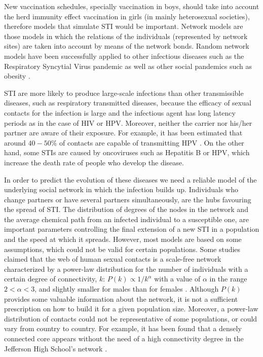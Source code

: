 New vaccination schedules, specially vaccination in boys, should take into account the herd immunity effect vaccination in girls (in mainly heterosexual societies), therefore models that simulate STI would be important. Network models are those models in which the relations of the individuals (represented by network sites) are taken into account by means of the network bonds. Random network models have been successfully applied to other infectious diseases such as the Respiratory Syncytial Virus pandemic \cite{acedo2011using} as well as other social pandemics such as obesity \cite{christakis2007spread}.

STI are more likely to produce large-scale infections than other transmissible diseases, such as respiratory transmitted diseases, because the efficacy of sexual contacts for the infection is large and the infectious agent has long latency periods as in the case of HIV or HPV. Moreover, neither the carrier nor his/her partner are aware of their exposure. For example, it has been estimated that around $40-50\%$ of contacts are capable of transmitting HPV \cite{burchell2006modeling}. On the other hand, some STIs are caused by oncoviruses such as Hepatitis B or HPV, which increase the death rate of people who develop the disease.

In order to predict the evolution of these diseases we need a reliable model of the underlying social network in which the 
infection builds up. Individuals who change partners or have several partners simultaneously, are the hubs favouring the spread
of STI. The distribution of degrees of the nodes in the network and the average chemical path from an infected individual to 
a susceptible one, are important parameters controlling the final extension of a new STI in a population and the speed at which it spreads. However, most models are based on some assumptions, which could not be valid for certain populations. Some studies claimed that the web of human sexual contacts is a scale-free network characterized by a power-law distribution for the number of individuals with a certain degree of connectivity, $k$: $P(k)\propto 1/k^\alpha$ with a value of $\alpha$ in the range $2 <\alpha < 3$, and slightly smaller for males than for females \cite{liljeros2001web}. Although $P(k)$ provides some valuable information about the network, it is not a sufficient prescription on how to build it for a given population size. Moreover, a power-law distribution of contacts could not be representative of some populations, or could vary from country to country. For example, it has been found that a densely connected core appears without the need of a high connectivity degree in the Jefferson High School's network \cite{bearman2004chains}. 

